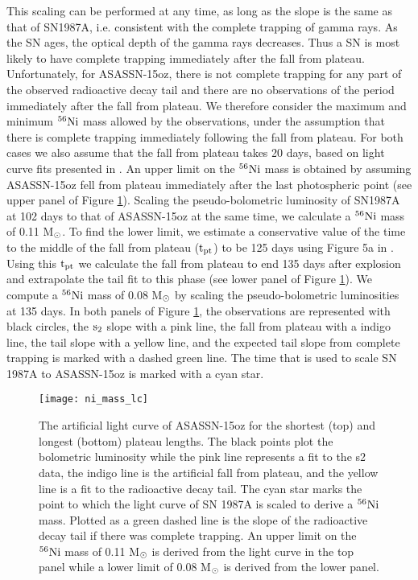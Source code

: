 \documentclass[a4paper,fleqn,usenatbib]{mnras}
\newcommand{\msun}{M$\rm{_{\odot}}$ }
\newcommand{\msunperiod}{M$\rm{_{\odot}}$}
\begin{document}
This scaling can be performed at any time, as long as the slope is the same as that of SN1987A, i.e. consistent with the complete trapping of gamma rays.
As the SN ages, the optical depth of the gamma rays decreases.
Thus a SN is most likely to have complete trapping immediately after the fall from plateau. 
Unfortunately, for ASASSN-15oz, there is not complete trapping for any part of the observed radioactive decay tail and there are no observations of the period immediately after the fall from plateau. 
We therefore consider the maximum and minimum $\rm{{}^{56}Ni}$ mass allowed by the observations, under the assumption that there is complete trapping immediately following the fall from plateau. 
For both cases we also assume that the fall from plateau takes 20 days, based on light curve fits presented in \citet{2016valenti}. 
An upper limit on the $\rm{{}^{56}Ni}$ mass is obtained by assuming ASASSN-15oz fell from plateau immediately after the last photospheric point  (see upper panel of Figure \ref{fig:Ni}).
Scaling the pseudo-bolometric luminosity of SN1987A at 102 days to that of ASASSN-15oz at the same time, we calculate a $\rm{{}^{56}Ni}$ mass of 0.11 \msunperiod.
To find the lower limit, we estimate a conservative value of the time to the middle of the fall from plateau ($\rm{t_{pt}}$) to be 125 days using Figure 5a in \citet{2016valenti}.
Using this $\rm{t_{pt}}$ we calculate the fall from plateau to end 135 days after explosion and extrapolate the tail fit to this phase (see lower panel of Figure \ref{fig:Ni}). 
We compute a $\rm{{}^{56}Ni}$ mass of 0.08 \msun by scaling the pseudo-bolometric luminosities at 135 days.
In both panels of Figure \ref{fig:Ni}, the observations are represented with black circles, the $\rm{s_{2}}$ slope with a pink line, the fall from plateau with a indigo line, the tail slope with a yellow line, and the expected tail slope from complete trapping is marked with a dashed green line. 
The time that is used to scale SN 1987A to ASASSN-15oz is marked with a cyan star.
\begin{figure}
\begin{center}
\texttt{[image: ni\_mass\_lc]} %
\caption{The artificial light curve of ASASSN-15oz for the shortest (top) and longest (bottom) plateau lengths. 
The black points plot the bolometric luminosity while the pink line represents a fit to the s2 data, the indigo line is the artificial fall from plateau, and the yellow line is a fit to the radioactive decay tail.
The cyan star marks the point to which the light curve of SN 1987A is scaled to derive a $\rm{{}^{56}Ni}$ mass. 
Plotted as a green dashed line is the slope of the radioactive decay tail if there was complete trapping.
An upper limit on the $\rm{{}^{56}Ni}$ mass of 0.11 \msun is derived from the light curve in the top panel while a lower limit of 0.08 \msun is derived from the lower panel. }
\label{fig:Ni}
\end{center}
\end{figure}
\end{document}
